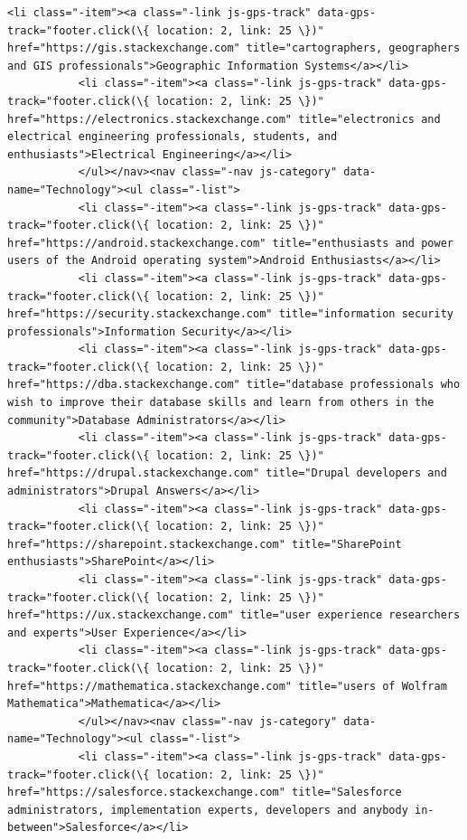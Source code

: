 \documentclass[11pt]{article}
\begin{document}
\begin{Verbatim}[commandchars=\\\{\}]
           <li class="-item"><a class="-link js-gps-track" data-gps-track="footer.click(\{ location: 2, link: 25 \})" href="https://gis.stackexchange.com" title="cartographers, geographers and GIS professionals">Geographic Information Systems</a></li>
           <li class="-item"><a class="-link js-gps-track" data-gps-track="footer.click(\{ location: 2, link: 25 \})" href="https://electronics.stackexchange.com" title="electronics and electrical engineering professionals, students, and enthusiasts">Electrical Engineering</a></li>
           </ul></nav><nav class="-nav js-category" data-name="Technology"><ul class="-list">
           <li class="-item"><a class="-link js-gps-track" data-gps-track="footer.click(\{ location: 2, link: 25 \})" href="https://android.stackexchange.com" title="enthusiasts and power users of the Android operating system">Android Enthusiasts</a></li>
           <li class="-item"><a class="-link js-gps-track" data-gps-track="footer.click(\{ location: 2, link: 25 \})" href="https://security.stackexchange.com" title="information security professionals">Information Security</a></li>
           <li class="-item"><a class="-link js-gps-track" data-gps-track="footer.click(\{ location: 2, link: 25 \})" href="https://dba.stackexchange.com" title="database professionals who wish to improve their database skills and learn from others in the community">Database Administrators</a></li>
           <li class="-item"><a class="-link js-gps-track" data-gps-track="footer.click(\{ location: 2, link: 25 \})" href="https://drupal.stackexchange.com" title="Drupal developers and administrators">Drupal Answers</a></li>
           <li class="-item"><a class="-link js-gps-track" data-gps-track="footer.click(\{ location: 2, link: 25 \})" href="https://sharepoint.stackexchange.com" title="SharePoint enthusiasts">SharePoint</a></li>
           <li class="-item"><a class="-link js-gps-track" data-gps-track="footer.click(\{ location: 2, link: 25 \})" href="https://ux.stackexchange.com" title="user experience researchers and experts">User Experience</a></li>
           <li class="-item"><a class="-link js-gps-track" data-gps-track="footer.click(\{ location: 2, link: 25 \})" href="https://mathematica.stackexchange.com" title="users of Wolfram Mathematica">Mathematica</a></li>
           </ul></nav><nav class="-nav js-category" data-name="Technology"><ul class="-list">
           <li class="-item"><a class="-link js-gps-track" data-gps-track="footer.click(\{ location: 2, link: 25 \})" href="https://salesforce.stackexchange.com" title="Salesforce administrators, implementation experts, developers and anybody in-between">Salesforce</a></li>

\end{Verbatim}
\end{document}
